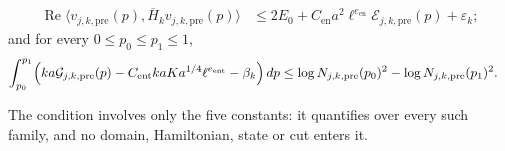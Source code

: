 \begin{definition}
    \begin{align}
        \operatorname{Re}\langle v_{j,k,\mathrm{pre}}(p),
        \overline H_k v_{j,k,\mathrm{pre}}(p)\rangle
         & \le2E_0+C_{\mathrm{en}}a^2\ell^{e_{\mathrm{en}}}
        \mathcal E_{j,k,\mathrm{pre}}(p)+\varepsilon_k;
    \end{align}
    and for every $0\le p_0\le p_1\le1$,
    \begin{align}
        \int_{p_0}^{p_1}\Bigl(ka\mathcal G_{j,k,\mathrm{pre}}(p)
        -C_{\mathrm{ent}}kaKa^{1/4}\ell^{e_{\mathrm{ent}}}-\beta_k\Bigr)\,dp
         & \le\log N_{j,k,\mathrm{pre}}(p_0)^2
        -\log N_{j,k,\mathrm{pre}}(p_1)^2.
    \end{align}

    The condition involves only the five constants: it quantifies over
    every such family, and no domain, Hamiltonian, state or cut enters it.
\end{definition}

